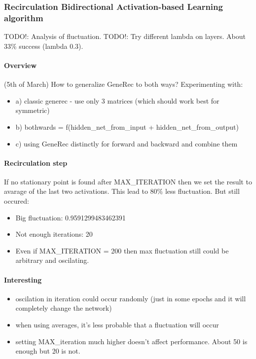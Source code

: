 \subsubsection{Recirculation Bidirectional Activation-based Learning algorithm} 
TODO!: Analysis of fluctuation. 
TODO!: Try different lambda on layers. 
About 33\% success (lambda 0.3). 

\paragraph{Overview} 
(5th of March) 
How to generalize GeneRec to both ways? 
Experimenting with:
\begin{itemize} 
\item  a) classic generec - use only 3 matrices (which should work best for symmetric) 
\item  b) bothwards = f(hidden\_net\_from\_input + hidden\_net\_from\_output) 
\item  c) using GeneRec distinctly for forward and backward and combine them 
\end{itemize} 

\paragraph{Recirculation step} 
If no stationary point is found after MAX\_ITERATION then we set the result to avarage of the last two activations. This lead to 80\% less fluctuation. But still occured: 
\begin{itemize}
\item Big fluctuation: 0.9591299483462391
\item Not enough iterations: 20
\item Even if MAX\_ITERATION = 200 then max fluctuation still could be arbitrary and oscilating.
\end{itemize} 

\paragraph{Interesting} 
\begin{itemize} 
  \item oscilation in iteration could occur randomly (just in some epochs and it will completely change the network) 
  \item when using averages, it's less probable that a fluctuation will occur 
  \item setting MAX\_iteration much higher doesn't affect performance. About 50 is enough but 20 is not. 
\end{itemize} 
  
